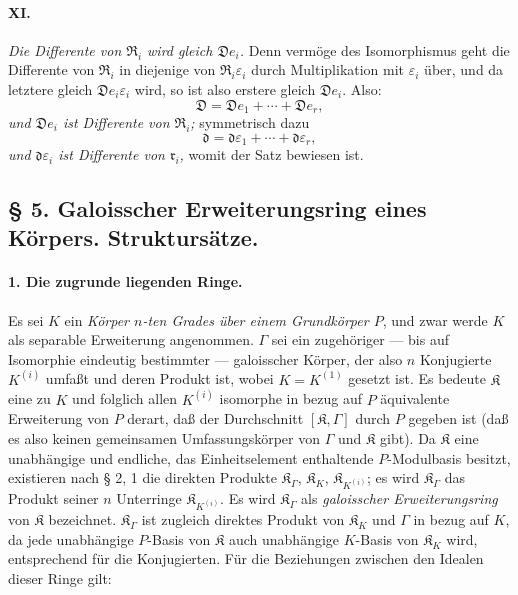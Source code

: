 \paragraph{XI.}
\emph{Die Differente von $\mathfrak R_i$ wird gleich $\mathfrak D e_i$.} Denn vermöge des Isomorphismus geht die Differente von $\mathfrak R_i$ in diejenige von $\mathfrak R_i\varepsilon_i$ durch Multiplikation mit $\varepsilon_i$ über, und da letztere gleich $\mathfrak D e_i\varepsilon_i$ wird, so ist also erstere gleich $\mathfrak D e_i$. Also:
\[
\mathfrak D=\mathfrak D e_1+\cdots+\mathfrak D e_r,
\]
\emph{und $\mathfrak D e_i$ ist Differente von $\mathfrak R_i$;} symmetrisch dazu
\[
\mathfrak d=\mathfrak d\varepsilon_1+\cdots+\mathfrak d\varepsilon_r,
\]
\emph{und $\mathfrak d\varepsilon_i$ ist Differente von $\mathfrak r_i$,} womit der Satz bewiesen ist.
\subsection*{\S{} 5. Galoisscher Erweiterungsring eines Körpers. Struktursätze.}

\paragraph{1. Die zugrunde liegenden Ringe.}
Es sei $K$ ein \emph{Körper $n$-ten Grades über einem Grundkörper $P$}, und zwar werde $K$ als separable Erweiterung angenommen. $\Gamma$ sei ein zugehöriger --- bis auf Isomorphie eindeutig bestimmter --- galoisscher Körper, der also $n$ Konjugierte $K^{(i)}$ umfaßt und deren Produkt ist, wobei $K=K^{(1)}$ gesetzt ist. Es bedeute $\mathfrak K$ eine zu $K$ und folglich allen $K^{(i)}$ isomorphe in bezug auf $P$ äquivalente Erweiterung von $P$ derart, daß der Durchschnitt $[\mathfrak K,\Gamma]$ durch $P$ gegeben ist (daß es also keinen gemeinsamen Umfassungskörper von $\Gamma$ und $\mathfrak K$ gibt). Da $\mathfrak K$ eine unabhängige und endliche, das Einheitselement enthaltende $P$-Modulbasis besitzt, existieren nach § 2, 1 die direkten Produkte $\mathfrak K_\Gamma$, $\mathfrak K_K$, $\mathfrak K_{K^{(i)}}$; es wird $\mathfrak K_\Gamma$ das Produkt seiner $n$ Unterringe $\mathfrak K_{K^{(i)}}$. Es wird $\mathfrak K_\Gamma$ als \emph{galoisscher Erweiterungsring} von $\mathfrak K$ bezeichnet. $\mathfrak K_\Gamma$ ist zugleich direktes Produkt von $\mathfrak K_K$ und $\Gamma$ in bezug auf $K$, da jede unabhängige $P$-Basis von $\mathfrak K$ auch unabhängige $K$-Basis von $\mathfrak K_K$ wird, entsprechend für die Konjugierten. Für die Beziehungen zwischen den Idealen dieser Ringe gilt:

